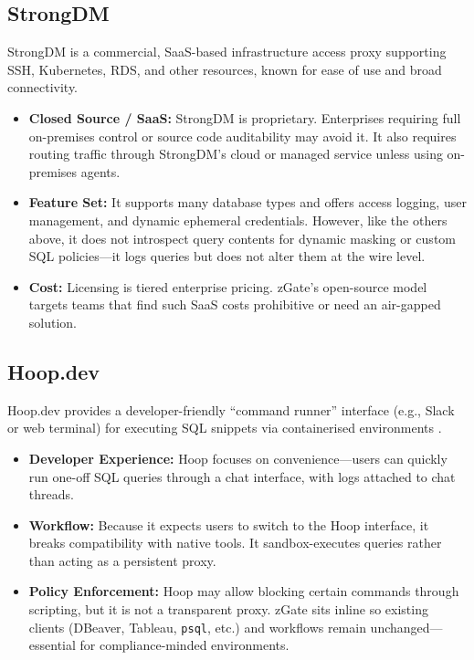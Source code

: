 \subsection{StrongDM}

StrongDM is a commercial, SaaS-based infrastructure access proxy supporting SSH, Kubernetes, RDS, and other resources, known for ease of use and broad connectivity.

\begin{itemize}
  \item \textbf{Closed Source / SaaS:} StrongDM is proprietary. Enterprises requiring full on-premises control or source code auditability may avoid it. It also requires routing traffic through StrongDM's cloud or managed service unless using on-premises agents.
  \item \textbf{Feature Set:} It supports many database types and offers access logging, user management, and dynamic ephemeral credentials. However, like the others above, it does not introspect query contents for dynamic masking or custom SQL policies---it logs queries but does not alter them at the wire level.
  \item \textbf{Cost:} Licensing is tiered enterprise pricing. zGate's open-source model targets teams that find such SaaS costs prohibitive or need an air-gapped solution.
\end{itemize}

\subsection{Hoop.dev}

Hoop.dev provides a developer-friendly ``command runner'' interface (e.g., Slack or web terminal) for executing SQL snippets via containerised environments \cite{hoop}.

\begin{itemize}
  \item \textbf{Developer Experience:} Hoop focuses on convenience---users can quickly run one-off SQL queries through a chat interface, with logs attached to chat threads.
  \item \textbf{Workflow:} Because it expects users to switch to the Hoop interface, it breaks compatibility with native tools. It sandbox-executes queries rather than acting as a persistent proxy.
  \item \textbf{Policy Enforcement:} Hoop may allow blocking certain commands through scripting, but it is not a transparent proxy. zGate sits inline so existing clients (DBeaver, Tableau, \texttt{psql}, etc.) and workflows remain unchanged---essential for compliance-minded environments.
\end{itemize}

